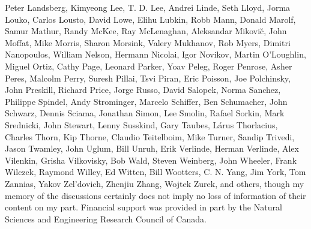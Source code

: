 Peter Landsberg, Kimyeong Lee, T. D. Lee, Andrei Linde,
Seth Lloyd, Jorma Louko, Carlos Lousto, David Lowe,
Elihu Lubkin, Robb Mann, Donald Marolf, Samur Mathur,
Randy McKee, Ray McLenaghan, Aleksandar Mikovi\u{c},
John Moffat, Mike Morris, Sharon Morsink, Valery Mukhanov,
Rob Myers, Dimitri Nanopoulos, William Nelson,
Hermann Nicolai, Igor Novikov, Martin O'Loughlin, Miguel Ortiz,
Cathy Page, Leonard Parker, Yoav Peleg, Roger Penrose,
Asher Peres, Malcolm Perry, Suresh Pillai, Tsvi Piran,
Eric Poisson, Joe Polchinsky, John Preskill, Richard Price,
Jorge Russo, David Salopek, Norma Sanchez, Philippe Spindel,
Andy Strominger, Marcelo Schiffer, Ben Schumacher,
John Schwarz, Dennis Sciama, Jonathan Simon, Lee Smolin,
Rafael Sorkin, Mark Srednicki, John Stewart, Lenny Susskind,
Gary Taubes, L\'{a}rus Thorlacius, Charles Thorn, Kip Thorne,
Claudio Teitelboim, Mike Turner, Sandip Trivedi,
Jason Twamley, John Uglum, Bill Unruh, Erik Verlinde,
Herman Verlinde, Alex Vilenkin, Grisha Vilkovisky, Bob Wald,
Steven Weinberg, John Wheeler, Frank Wilczek, Raymond Willey,
Ed Witten, Bill Wootters, C. N. Yang, Jim York, Tom Zannias,
Yakov Zel'dovich, Zhenjiu Zhang, Wojtek Zurek,
and others, though my memory of the discussions certainly
does not imply no loss of information of their content on my part.
Financial support was provided in part by the Natural Sciences and
Engineering Research Council of Canada.

